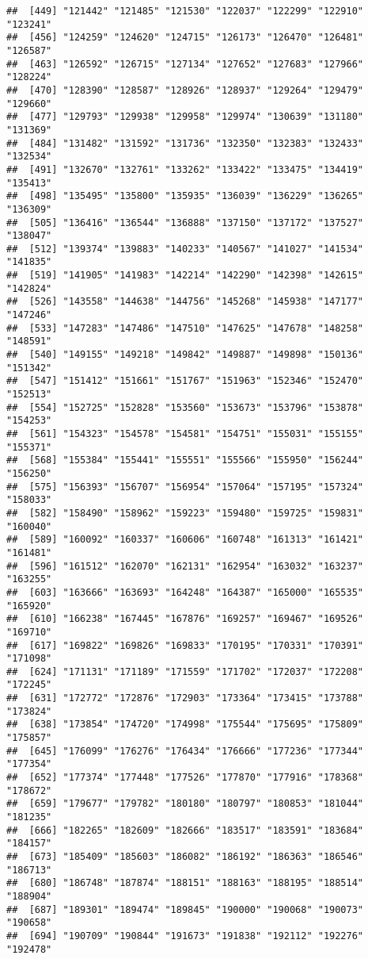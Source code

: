 \documentclass[]{article}
\begin{document}
\begin{verbatim}
##  [449] "121442" "121485" "121530" "122037" "122299" "122910" "123241"
##  [456] "124259" "124620" "124715" "126173" "126470" "126481" "126587"
##  [463] "126592" "126715" "127134" "127652" "127683" "127966" "128224"
##  [470] "128390" "128587" "128926" "128937" "129264" "129479" "129660"
##  [477] "129793" "129938" "129958" "129974" "130639" "131180" "131369"
##  [484] "131482" "131592" "131736" "132350" "132383" "132433" "132534"
##  [491] "132670" "132761" "133262" "133422" "133475" "134419" "135413"
##  [498] "135495" "135800" "135935" "136039" "136229" "136265" "136309"
##  [505] "136416" "136544" "136888" "137150" "137172" "137527" "138047"
##  [512] "139374" "139883" "140233" "140567" "141027" "141534" "141835"
##  [519] "141905" "141983" "142214" "142290" "142398" "142615" "142824"
##  [526] "143558" "144638" "144756" "145268" "145938" "147177" "147246"
##  [533] "147283" "147486" "147510" "147625" "147678" "148258" "148591"
##  [540] "149155" "149218" "149842" "149887" "149898" "150136" "151342"
##  [547] "151412" "151661" "151767" "151963" "152346" "152470" "152513"
##  [554] "152725" "152828" "153560" "153673" "153796" "153878" "154253"
##  [561] "154323" "154578" "154581" "154751" "155031" "155155" "155371"
##  [568] "155384" "155441" "155551" "155566" "155950" "156244" "156250"
##  [575] "156393" "156707" "156954" "157064" "157195" "157324" "158033"
##  [582] "158490" "158962" "159223" "159480" "159725" "159831" "160040"
##  [589] "160092" "160337" "160606" "160748" "161313" "161421" "161481"
##  [596] "161512" "162070" "162131" "162954" "163032" "163237" "163255"
##  [603] "163666" "163693" "164248" "164387" "165000" "165535" "165920"
##  [610] "166238" "167445" "167876" "169257" "169467" "169526" "169710"
##  [617] "169822" "169826" "169833" "170195" "170331" "170391" "171098"
##  [624] "171131" "171189" "171559" "171702" "172037" "172208" "172245"
##  [631] "172772" "172876" "172903" "173364" "173415" "173788" "173824"
##  [638] "173854" "174720" "174998" "175544" "175695" "175809" "175857"
##  [645] "176099" "176276" "176434" "176666" "177236" "177344" "177354"
##  [652] "177374" "177448" "177526" "177870" "177916" "178368" "178672"
##  [659] "179677" "179782" "180180" "180797" "180853" "181044" "181235"
##  [666] "182265" "182609" "182666" "183517" "183591" "183684" "184157"
##  [673] "185409" "185603" "186082" "186192" "186363" "186546" "186713"
##  [680] "186748" "187874" "188151" "188163" "188195" "188514" "188904"
##  [687] "189301" "189474" "189845" "190000" "190068" "190073" "190658"
##  [694] "190709" "190844" "191673" "191838" "192112" "192276" "192478"

\end{verbatim}
\end{document}
